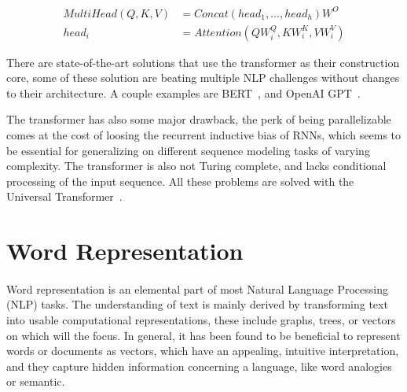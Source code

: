 \begin{equation}
    \begin{split}
        MultiHead(Q, K, V) & = Concat\left(head_{1}, \ldots,  head_{h}\right) W^{O} \\
        head_{i} & = Attention \left(Q W_{i}^{Q}, K W_{i}^{K}, V W_{i}^{V}\right)
    \end{split}
    \label{eq:multi_attention}
\end{equation}

There are state-of-the-art solutions that use the transformer as their construction core, some of these solution are beating multiple NLP challenges without changes to their architecture. A couple examples are BERT~\citep{devlin2018bert}, and OpenAI GPT~\citep{radford2018improving}. 

The transformer has also some major drawback, the perk of being parallelizable comes at the cost of loosing the recurrent inductive bias of RNNs, which seems to be essential for generalizing on different sequence modeling tasks of varying complexity. The transformer is also not Turing complete, and lacks conditional processing of the input sequence. All these problems are solved with the Universal Transformer~\citep{dehghani2018universal}. 

\section{Word Representation}
\label{sec:word_embedding}
\paragraph{}
Word representation is an elemental part of most Natural Language Processing (NLP) tasks. The understanding of text is mainly derived by transforming text into usable computational representations, these include graphs, trees, or vectors on which will the focus.   In general, it has been found to be beneficial to represent words or documents as vectors, which have an appealing, intuitive interpretation, and they capture hidden information concerning a language, like word analogies or semantic. 


